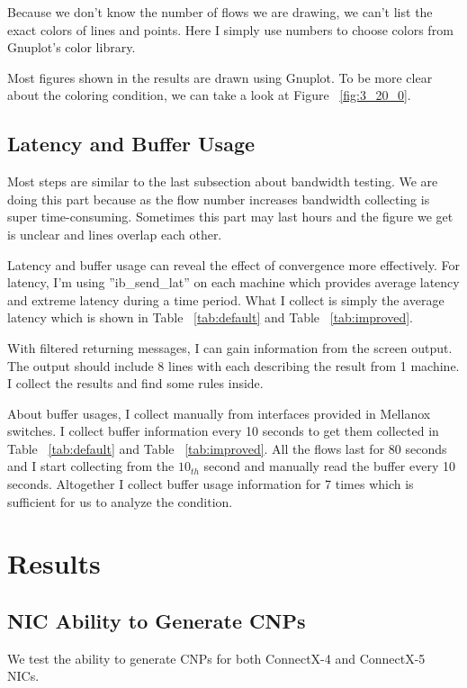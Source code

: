 \documentclass[12pt,a4paper]{article}
\begin{document}
Because we don't know the number of flows we are drawing, we can't list the exact colors of lines and points.
Here I simply use numbers to choose colors from Gnuplot's color library.

Most figures shown in the results are drawn using Gnuplot.
To be more clear about the coloring condition, we can take a look at Figure ~\ref{fig:3_20_0}.

\subsection{Latency and Buffer Usage}

Most steps are similar to the last subsection about bandwidth testing.
We are doing this part because as the flow number increases bandwidth collecting is super time-consuming.
Sometimes this part may last hours and the figure we get is unclear and lines overlap each other.

Latency and buffer usage can reveal the effect of convergence more effectively.
For latency, I'm using ''ib\_send\_lat'' on each machine which provides average latency and extreme latency during a time period.
What I collect is simply the average latency which is shown in Table ~\ref{tab:default} and Table ~\ref{tab:improved}.

With filtered returning messages, I can gain information from the screen output.
The output should include 8 lines with each describing the result from 1 machine.
I collect the results and find some rules inside.

About buffer usages, I collect manually from interfaces provided in Mellanox switches.
I collect buffer information every 10 seconds to get them collected in Table ~\ref{tab:default} and Table ~\ref{tab:improved}.
All the flows last for 80 seconds and I start collecting from the $10_{th}$ second and manually read the buffer every 10 seconds.
Altogether I collect buffer usage information for 7 times which is sufficient for us to analyze the condition.

\newpage
\section{Results}

\subsection{NIC Ability to Generate CNPs}
We test the ability to generate CNPs for both ConnectX-4 and ConnectX-5 NICs.
\end{document}

